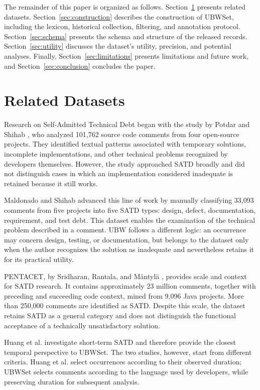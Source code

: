 \documentclass[10pt,conference]{IEEEtran}
\begin{document}
The remainder of this paper is organized as follows. Section~\ref{sec:related} presents related datasets. Section~\ref{sec:construction} describes the construction of UBWSet, including the lexicon, historical collection, filtering, and annotation protocol. Section~\ref{sec:schema} presents the schema and structure of the released records. Section~\ref{sec:utility} discusses the dataset's utility, precision, and potential analyses. Finally, Section~\ref{sec:limitations} presents limitations and future work, and Section~\ref{sec:conclusion} concludes the paper.

\section{Related Datasets}
\label{sec:related}

Research on Self-Admitted Technical Debt began with the study by Potdar and
Shihab \cite{potdar2014exploratory}, who analyzed 101,762 source code comments
from four open-source projects. They identified textual patterns associated with
temporary solutions, incomplete implementations, and other technical problems
recognized by developers themselves. However, the study approached SATD broadly
and did not distinguish cases in which an implementation considered inadequate is
retained because it still works.

Maldonado and Shihab \cite{maldonado2015detecting} advanced this line of work by
manually classifying 33,093 comments from five projects into five SATD types:
design, defect, documentation, requirement, and test debt. This dataset enables
the examination of the technical problem described in a comment. UBW follows a
different logic: an occurrence may concern design, testing, or documentation, but
belongs to the dataset only when the author recognizes the solution as inadequate
and nevertheless retains it for its practical utility.

PENTACET, by Sridharan, Rantala, and M{\"a}ntyl{\"a}
\cite{sridharan2023pentacet}, provides scale and context for SATD research. It
contains approximately 23 million comments, together with preceding and
succeeding code context, mined from 9,096 Java projects. More than 250,000
comments are identified as SATD. Despite this scale, the dataset retains SATD as a
general category and does not distinguish the functional acceptance of a
technically unsatisfactory solution.

Huang et al. \cite{huang2025shortterm} investigate short-term SATD and therefore
provide the closest temporal perspective to UBWSet. The two studies, however,
start from different criteria. Huang et al. select occurrences according to their
observed duration; UBWSet selects comments according to the language used by
developers, while preserving duration for subsequent analysis.
\end{document}
